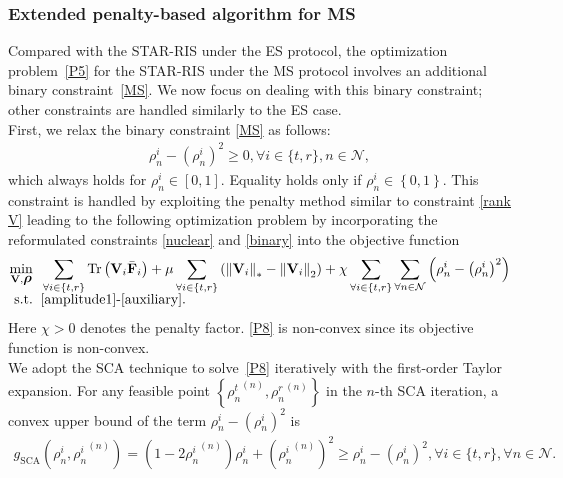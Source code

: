 \documentclass[12pt, draftclsnofoot, onecolumn]{IEEEtran}
\DeclareMathOperator{\tr}{Tr}
\newcommand{\bm}[1]{\mbox{\boldmath{$#1$}}}
\begin{document}
\subsubsection{Extended penalty-based algorithm for MS}
Compared with the STAR-RIS under the ES protocol, the optimization problem~\eqref{P5} for the STAR-RIS under the MS protocol involves an additional binary constraint~\eqref{MS}. We now focus on dealing with this binary constraint; other constraints are handled similarly to the ES case.\\
\indent First, we relax the binary constraint \eqref{MS} as follows:
\begin{equation}\label{binary}
\begin{aligned}
{\rho}_n^i-\left({\rho}_n^i\right)^2 \ge 0, \forall i\in\{t,r\}, n\in\mathcal{N},
\end{aligned}
\end{equation} 
which always holds for ${\rho}_n^i \in\left[0,1\right]$. Equality holds only if ${\rho}_n^i \in\left\{0,1\right\}$. This constraint is handled by exploiting the penalty method similar to constraint \eqref{rank V} leading to the following optimization problem by incorporating the reformulated constraints \eqref{nuclear} and \eqref{binary} into the objective function
\begin{subequations}\label{P8}
\begin{align}
\mathop {\min }\limits_{ {{\mathbf{V}},{\bm{\rho}}} } \;\;&\sum_{ \forall i \in \{t,r\}}\tr\left({\mathbf{V}}_i\bar{\mathbf{F}}_i\right)+\mu\sum_{ \forall i \in \{t,r\}}\left(\left\|{\mathbf{V}}_i\right\|_*-\left\|{\mathbf{V}}_i\right\|_2\right)+\chi\sum_{ \forall i \in \{t,r\}}\sum_{ \forall n \in \mathcal{N}}\left({\rho}_n^i-\left({\rho}_n^i\right)^2\right)\\[-0.2cm]
{\rm{s.t.}}\;\;& \eqref{amplitude1}\text{-}\eqref{auxiliary}.
\end{align}
\end{subequations}
Here $\chi>0$ denotes the penalty factor. \eqref{P8} is non-convex since its objective function is non-convex.\\
\indent We adopt the SCA technique to solve~\eqref{P8} iteratively with the first-order Taylor expansion. For any feasible point $\left\{{{{\rho}}_n^t}^{(n)},{{{\rho}}_n^r}^{(n)}\right\}$ in the $n$-th SCA iteration, a convex upper bound of the term $\rho_n^i-\left(\rho_n^i\right)^2$ is 
\begin{equation}\label{binarysca}
\begin{aligned}
g_{\text{SCA}}\left(\rho_n^i,{\rho_n^i}^{(n)}\right)=\left({1}-2{\rho_n^i}^{(n)}\right)\rho_n^i+\left({\rho_n^i}^{(n)}\right)^2\ge\rho_n^i-\left(\rho_n^i\right)^2, \forall i \in \{t,r\}, \forall n \in \mathcal{N}.
\end{aligned}
\end{equation}
\end{document}
